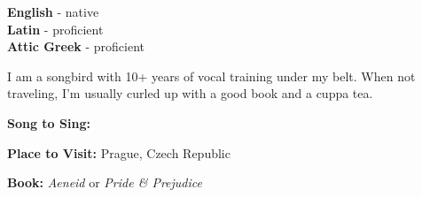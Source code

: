 \begin{minipage}[t]{0.2\textwidth}
	\vspace{-\baselineskip} %

	
	\textbf{English} - native\\
	\textbf{Latin} - proficient\\
	\textbf{Attic Greek} - proficient
\end{minipage}
\hfill
\begin{minipage}[t]{0.35\textwidth}
	\vspace{-\baselineskip} %
	
	
	I am a songbird with 10+ years of vocal training under my belt. When not traveling, I'm usually curled up with a good book and a cuppa tea. 
\end{minipage}
\hfill
\begin{minipage}[t]{0.35\textwidth}
	\vspace{-\baselineskip} %
	
	
	\textbf{Song to Sing:} 
	
	\textbf{Place to Visit:} Prague, Czech Republic
	
	\textbf{Book:} \textit{Aeneid} or \textit{Pride \& Prejudice}
\end{minipage}